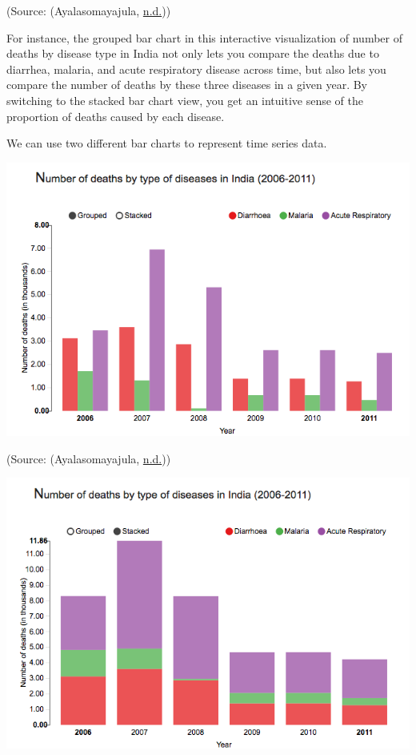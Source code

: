 \documentclass[]{book}
\begin{document}
(Source: (Ayalasomayajula, \protect\hyperlink{ref-aya-time-series}{n.d.}))

For instance, the grouped bar chart in this interactive visualization of number of deaths by disease type in India not only lets you compare the deaths due to diarrhea, malaria, and acute respiratory disease across time, but also lets you compare the number of deaths by these three diseases in a given year. By switching to the stacked bar chart view, you get an intuitive sense of the proportion of deaths caused by each disease.

We can use two different bar charts to represent time series data.

\includegraphics{images/aya-bar1.png}

(Source: (Ayalasomayajula, \protect\hyperlink{ref-aya-time-series}{n.d.}))

\includegraphics{images/aya-bar2.png}
\end{document}
